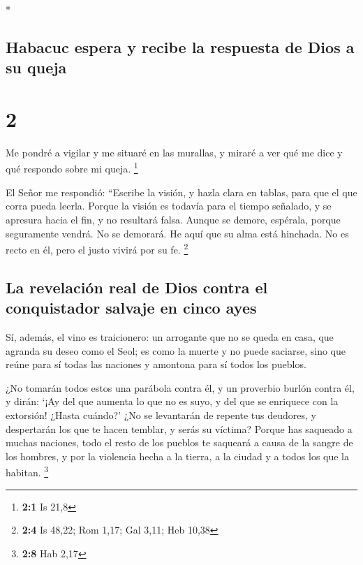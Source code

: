 \begin{paracol}{2}
\begin{otherlanguage}{english}
\end{otherlanguage}

\switchcolumn[0]*

\hypertarget{habacuc-espera-y-recibe-la-respuesta-de-dios-a-su-queja}{%
\subsection{Habacuc espera y recibe la respuesta de Dios a su
queja}\label{habacuc-espera-y-recibe-la-respuesta-de-dios-a-su-queja}}

\hypertarget{section-2}{%
\section{2}\label{section-2}}

 Me pondré a vigilar y me situaré en las murallas, y
miraré a ver qué me dice y qué respondo sobre mi queja. \footnote{\textbf{2:1}
  Is 21,8}

 El Señor me respondió: ``Escribe la visión, y hazla clara
en tablas, para que el que corra pueda leerla.  Porque la
visión es todavía para el tiempo señalado, y se apresura hacia el fin, y
no resultará falsa. Aunque se demore, espérala, porque seguramente
vendrá. No se demorará.  He aquí que su alma está
hinchada. No es recto en él, pero el justo vivirá por su fe. \footnote{\textbf{2:4}
  Is 48,22; Rom 1,17; Gal 3,11; Heb 10,38}

\hypertarget{la-revelaciuxf3n-real-de-dios-contra-el-conquistador-salvaje-en-cinco-ayes}{%
\subsection{La revelación real de Dios contra el conquistador salvaje en
cinco
ayes}\label{la-revelaciuxf3n-real-de-dios-contra-el-conquistador-salvaje-en-cinco-ayes}}

 Sí, además, el vino es traicionero: un arrogante que no
se queda en casa, que agranda su deseo como el Seol; es como la muerte y
no puede saciarse, sino que reúne para sí todas las naciones y amontona
para sí todos los pueblos.

 ¿No tomarán todos estos una parábola contra él, y un
proverbio burlón contra él, y dirán: `¡Ay del que aumenta lo que no es
suyo, y del que se enriquece con la extorsión! ¿Hasta cuándo?'
 ¿No se levantarán de repente tus deudores, y despertarán
los que te hacen temblar, y serás su víctima?  Porque has
saqueado a muchas naciones, todo el resto de los pueblos te saqueará a
causa de la sangre de los hombres, y por la violencia hecha a la tierra,
a la ciudad y a todos los que la habitan. \footnote{\textbf{2:8} Hab
  2,17}


\end{paracol}
